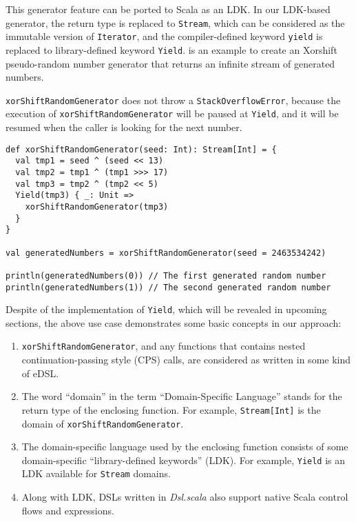 This generator feature can be ported to Scala as an LDK. In our LDK-based generator, the return type is replaced to \lstinline{Stream}, which can be considered as the immutable version of \lstinline{Iterator}, and the compiler-defined keyword \lstinline{yield} is replaced to library-defined keyword \lstinline{Yield}.  is an example to create an Xorshift \cite{marsaglia2003xorshift} pseudo-random number generator that returns an infinite stream of generated numbers. 

\lstinline{xorShiftRandomGenerator} does not throw a \lstinline{StackOverflowError}, because the execution of \lstinline{xorShiftRandomGenerator} will be paused at \lstinline{Yield}, and it will be resumed when the caller is looking for the next number.

\begin{lstlisting}[caption={An Xorshift pseudo-random number generator with the help of the LDK \lstinline{Yield}},label={xorShiftRandomGenerator}]
def xorShiftRandomGenerator(seed: Int): Stream[Int] = {
  val tmp1 = seed ^ (seed << 13)
  val tmp2 = tmp1 ^ (tmp1 >>> 17)
  val tmp3 = tmp2 ^ (tmp2 << 5)
  Yield(tmp3) { _: Unit =>
    xorShiftRandomGenerator(tmp3)
  }
}

val generatedNumbers = xorShiftRandomGenerator(seed = 2463534242)

println(generatedNumbers(0)) // The first generated random number
println(generatedNumbers(1)) // The second generated random number
\end{lstlisting}

Despite of the implementation of \lstinline{Yield}, which will be revealed in upcoming sections, the above use case demonstrates some basic concepts in our approach:

\begin{enumerate}
  \item \lstinline{xorShiftRandomGenerator}, and any functions that contains nested continuation-passing style (CPS) calls, are considered as written in some kind of eDSL.
  \item The word ``domain'' in the term ``Domain-Specific Language'' stands for the return type of the enclosing function. For example, \lstinline{Stream[Int]} is the domain of \lstinline{xorShiftRandomGenerator}.
  \item The domain-specific language used by the enclosing function consists of some domain-specific ``library-defined keywords'' (LDK). For example, \lstinline{Yield} is an LDK available for \lstinline{Stream} domains.
  \item Along with LDK, DSLs written in \textit{Dsl.scala} also support native Scala control flows and expressions.
\end{enumerate}

